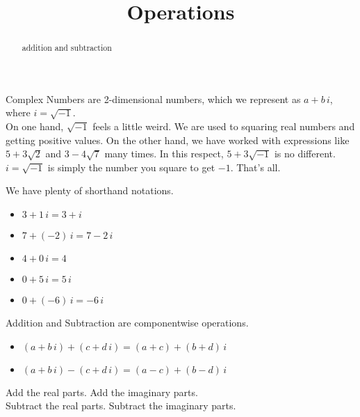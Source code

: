 \documentclass{ximera}
\title{Operations}
\begin{document}
\begin{abstract}
addition and subtraction
\end{abstract}
\maketitle



Complex Numbers are 2-dimensional numbers, which we represent as $a + b \, i$, where $i = \sqrt{-1}$. \\





On one hand, $\sqrt{-1}$ feels a little weird.  We are used to squaring real numbers and getting positive values. On the other hand, we have worked with expressions like $5 + 3 \sqrt{2}$ and $3 - 4 \sqrt{7}$ many times.  In this respect, $5 + 3 \sqrt{-1}$ is no different.  $i = \sqrt{-1}$ is simply the number you square to get $-1$.  That's all.



\begin{notation}



We have plenty of shorthand notations.

\begin{itemize}
\item $3 + 1 \, i = 3 + i$
\item $7 + (-2) \, i = 7 - 2 \, i$
\item $4 + 0 \, i = 4$
\item $0 + 5 \, i = 5 \, i$
\item $0 + (-6) \, i = -6 \, i$
\end{itemize}


\end{notation}





Addition and Subtraction are componentwise operations.


\begin{itemize}
	\item $(a + b \, i) + (c + d \, i) = (a+c) + (b+d) \, i$
	\item $(a + b \, i) - (c + d \, i) = (a-c) + (b-d) \, i$
\end{itemize}

Add the real parts. Add the imaginary parts. \\
Subtract the real parts. Subtract the imaginary parts. \\
\end{document}
